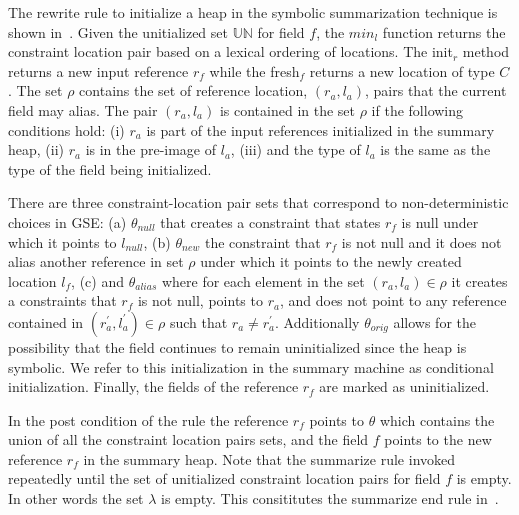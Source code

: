 
The rewrite rule to initialize a heap in the symbolic summarization
technique is shown in~. Given the unitialized set
$\mathbb{UN}$ for field $f$, the $\mathit{min}_l$ function returns the
constraint location pair based on a lexical ordering of locations. The
init$_r$ method returns a new input reference $r_f$ while the
fresh$_f$ returns a new location of type $C$. The set $\rho$ contains
the set of reference location, $(r_a, l_a)$, pairs that the current
field may alias. The pair $(r_a, l_a)$ is contained in the set $ \rho
$ if the following conditions hold: (i) $r_a$ is part of the input
references initialized in the summary heap, (ii) $r_a$ is in the
pre-image of $l_a$, (iii) and the type of $l_a$ is the same as the
type of the field being initialized.

There are three constraint-location pair sets that correspond to
non-deterministic choices in GSE: (a) $\theta_\mathit{null}$ that
creates a constraint that states $r_f$ is null under which it points
to $l_\mathit{null}$, (b) $\theta_\mathit{new}$ the constraint that
$r_f$ is not null and it does not alias another reference in set
$\rho$ under which it points to the newly created location $l_f$, (c)
and $\theta_\mathit{alias}$ where for each element in the set $(r_a,
l_a) \in \rho$ it creates a constraints that $r_f$ is not null, points
to $r_a$, and does not point to any reference contained in
$(r_a^\prime, l_a^\prime) \in \rho$ such that $r_a \neq
r_a^\prime$. Additionally $\theta_\mathit{orig}$ allows for the
possibility that the field continues to remain uninitialized since the
heap is symbolic. We refer to this initialization in the summary
machine as conditional initialization. Finally, the fields of the
reference $r_f$ are marked as uninitialized.

In the post condition of the rule the reference $r_f$ points to
$\theta$ which contains the union of all the constraint location pairs
sets, and the field $f$ points to the new reference $r_f$ in the
summary heap.  Note that the summarize rule invoked repeatedly until
the set of unitialized constraint location pairs for field $f$ is
empty. In other words the set $\lambda$ is empty. This consititutes
the summarize end rule in~.

